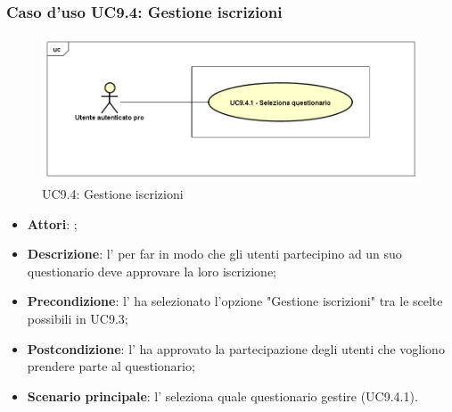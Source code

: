 	 \subsubsection{Caso d'uso UC9.4: Gestione iscrizioni}
	 \label{UC9.4}
	 \begin{figure}[h]
	 	\centering
	 	\includegraphics[scale=0.5,keepaspectratio]{UML/UC9_4.png}
	 	\caption{UC9.4: Gestione iscrizioni}
	 \end{figure}
	 \FloatBarrier
	 \begin{itemize}
	 	\item \textbf{Attori}: \uaupro{};
	 	\item \textbf{Descrizione}: l'\uaupro{} per far in modo che gli utenti partecipino ad un suo questionario deve approvare la loro iscrizione;
	 	\item \textbf{Precondizione}: l'\uaupro{} ha selezionato l'opzione "Gestione iscrizioni" tra le scelte possibili in UC9.3;
	 	\item \textbf{Postcondizione}: l'\uaupro{} ha approvato la partecipazione degli utenti che vogliono prendere parte al questionario;
	 	\item \textbf{Scenario principale}: l'\uaupro{} seleziona quale questionario gestire (UC9.4.1).
	 \end{itemize}
	 
